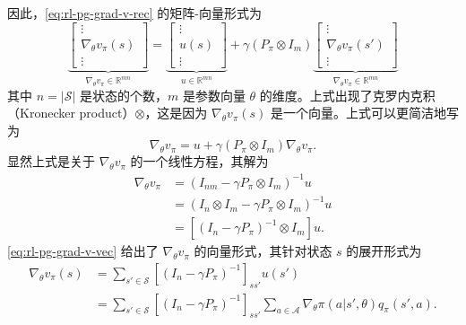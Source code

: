 \begin{note}
\begin{equation}
\end{equation}
因此，\cref{eq:rl-pg-grad-v-rec} 的矩阵-向量形式为
\begin{equation}
\underbrace{\left[ \begin{array}{c} \vdots \\ \nabla_{\theta} v_{\pi}(s) \\ \vdots \end{array} \right]}_{\nabla_{\theta} v_{\pi} \in \mathbb{R}^{mn}} = \underbrace{\left[ \begin{array}{c} \vdots \\ u(s) \\ \vdots \end{array} \right]}_{u \in \mathbb{R}^{mn}} + \gamma (P_{\pi} \otimes I_m) \underbrace{\left[ \begin{array}{c} \vdots \\ \nabla_{\theta} v_{\pi}(s') \\ \vdots \end{array} \right]}_{\nabla_{\theta} v_{\pi} \in \mathbb{R}^{mn}}
\end{equation}
其中 $n = |\mathcal{S}|$ 是状态的个数，$m$ 是参数向量 $\theta$ 的维度。上式出现了克罗内克积（Kronecker product）$\otimes$，这是因为 $\nabla_{\theta}v_{\pi}(s)$ 是一个向量。上式可以更简洁地写为
\begin{equation}
\nabla_{\theta} v_{\pi} = u + \gamma (P_{\pi} \otimes I_m) \nabla_{\theta} v_{\pi}.
\end{equation}
显然上式是关于 $\nabla_{\theta}v_{\pi}$ 的一个线性方程，其解为
\begin{equation}
\begin{aligned}
\nabla_{\theta} v_{\pi} &= (I_{nm} - \gamma P_{\pi} \otimes I_m)^{-1} u \\
&= (I_n \otimes I_m - \gamma P_{\pi} \otimes I_m)^{-1} u \\
&= [(I_n - \gamma P_{\pi})^{-1} \otimes I_m] u.
\end{aligned}
\label{eq:rl-pg-grad-v-vec}
\end{equation}
\cref{eq:rl-pg-grad-v-vec} 给出了 $\nabla_{\theta}v_{\pi}$ 的向量形式，其针对状态 $s$ 的展开形式为
\begin{equation}
\begin{aligned}
\nabla_{\theta} v_{\pi}(s) &= \sum_{s' \in \mathcal{S}} \left[(I_n - \gamma P_{\pi})^{-1}\right]_{ss'} u(s') \\
&= \sum_{s' \in \mathcal{S}} \left[(I_n - \gamma P_{\pi})^{-1}\right]_{ss'} \sum_{a \in \mathcal{A}} \nabla_{\theta} \pi(a|s',\theta) q_{\pi}(s',a).

\end{aligned}
\end{equation}
\end{note}
